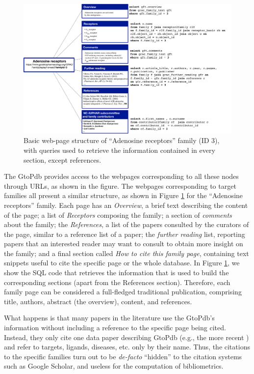 \begin{figure}[]
\centering
  \includegraphics[width=1\textwidth]{figures/family_structure}
  \caption{Basic web-page structure of ``Adenosine receptors'' family (ID 3), with queries used to retrieve the information contained in every section, except references.}
  \label{figure:family_structure}
\end{figure}


The GtoPdb provides access to the webpages corresponding to all these nodes through URLs, as shown in the figure. 
The webpages corresponding to target families all present a similar structure, as shown in Figure \ref{figure:family_structure} for the ``Adenosine receptors'' family. 
Each page has an \emph{Overview}, a brief text describing the content of the page; a list of \emph{Receptors} composing the family; a section of \emph{comments} about the family;
the \emph{References}, a list of the papers consulted by the curators of the page, similar to a reference list of a paper;
the \emph{further reading} list, reporting papers that an interested reader may want to consult to obtain more insight on the family; and a final section called \emph{How to cite this family page}, containing text snippets useful to cite the specific page or the whole database. 
In Figure \ref{figure:family_structure}, we show the SQL code that retrieves the information that is used to build the corresponding sections (apart from the References section).
Therefore, each family page can be considered a full-fledged traditional publication, comprising title, authors, abstract (the overview), content, and references. 

What happens is that many papers in the literature use the GtoPdb's information without including a reference to the specific page being cited. 
Instead, they only cite one data paper describing GtoPdb (e.g., the more recent \citep{iuphar2018}) and refer to targets, ligands, diseases, etc. only by their name. 
Thus, the citations to the specific families turn out to be \emph{de-facto} ``hidden'' to the citation systems such as Google Scholar, and useless for the computation of bibliometrics. 

